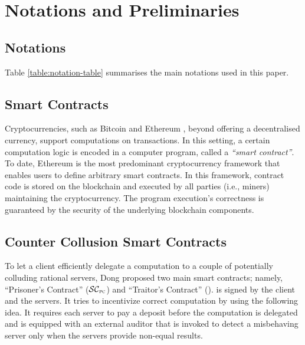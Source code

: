 

\vs

\section{Notations and Preliminaries}

\vs
\subsection{Notations}

Table \ref{table:notation-table} summarises the main notations used in this paper. 

\vs




\vs





\vs 


\subsection{Smart Contracts}
\svs

Cryptocurrencies, such as Bitcoin \cite{bitcoin} and Ethereum \cite{ethereum}, beyond offering a decentralised currency,  support computations on transactions. In this setting, a certain computation logic is encoded in a computer program, called a \emph{``smart contract''}. To date, Ethereum is the most predominant cryptocurrency framework that enables users to define arbitrary smart contracts. In this framework,  contract code is stored on the blockchain and executed by all parties (i.e., miners) maintaining the cryptocurrency. The program execution's correctness is guaranteed by the security of the underlying blockchain components. %

\vs


\subsection{Counter Collusion Smart Contracts}\label{Counter-Collusion-Smart-Contracts}



To let a client efficiently delegate a computation to a  couple of potentially colluding rational servers, Dong   \et \cite{dong2017betrayal} proposed two main smart contracts; namely, ``Prisoner's Contract'' ($\SCpc$) and ``Traitor's Contract'' (\SCtc).  
%
\SCpc is signed by the client and the servers. It tries to incentivize correct computation by using the following idea. It requires each server to pay a deposit before the computation is delegated and is equipped with an external auditor that is invoked to detect a misbehaving server only when the servers provide non-equal results. 



